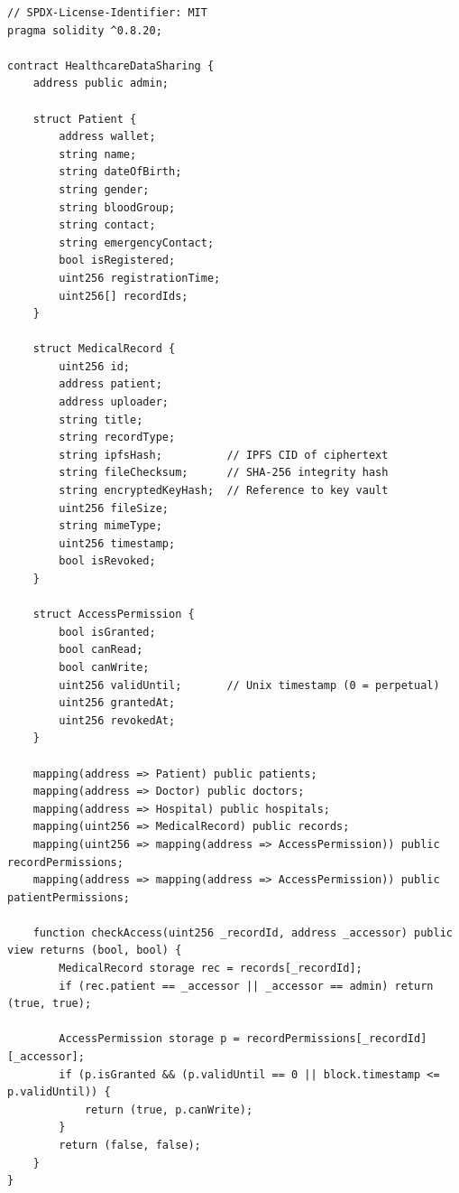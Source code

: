 \documentclass[11pt,a4paper]{article}
\begin{document}
\begin{lstlisting}[caption={Core Data Structures and Access Control Logic.}, label={lst:solidity}]
// SPDX-License-Identifier: MIT
pragma solidity ^0.8.20;

contract HealthcareDataSharing {
    address public admin;

    struct Patient {
        address wallet;
        string name;
        string dateOfBirth;
        string gender;
        string bloodGroup;
        string contact;
        string emergencyContact;
        bool isRegistered;
        uint256 registrationTime;
        uint256[] recordIds;
    }

    struct MedicalRecord {
        uint256 id;
        address patient;
        address uploader;
        string title;
        string recordType;
        string ipfsHash;          // IPFS CID of ciphertext
        string fileChecksum;      // SHA-256 integrity hash
        string encryptedKeyHash;  // Reference to key vault
        uint256 fileSize;
        string mimeType;
        uint256 timestamp;
        bool isRevoked;
    }

    struct AccessPermission {
        bool isGranted;
        bool canRead;
        bool canWrite;
        uint256 validUntil;       // Unix timestamp (0 = perpetual)
        uint256 grantedAt;
        uint256 revokedAt;
    }

    mapping(address => Patient) public patients;
    mapping(address => Doctor) public doctors;
    mapping(address => Hospital) public hospitals;
    mapping(uint256 => MedicalRecord) public records;
    mapping(uint256 => mapping(address => AccessPermission)) public recordPermissions;
    mapping(address => mapping(address => AccessPermission)) public patientPermissions;

    function checkAccess(uint256 _recordId, address _accessor) public view returns (bool, bool) {
        MedicalRecord storage rec = records[_recordId];
        if (rec.patient == _accessor || _accessor == admin) return (true, true);

        AccessPermission storage p = recordPermissions[_recordId][_accessor];
        if (p.isGranted && (p.validUntil == 0 || block.timestamp <= p.validUntil)) {
            return (true, p.canWrite);
        }
        return (false, false);
    }
}
\end{lstlisting}
\end{document}
